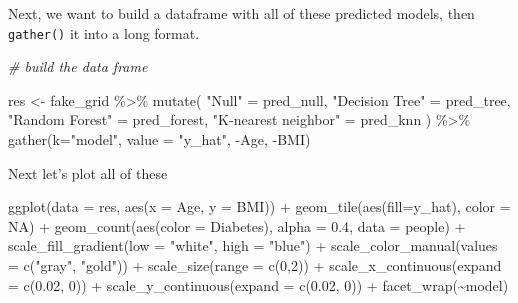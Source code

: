 \documentclass[
]{article}
\newenvironment{Shaded}{\begin{snugshade}}{\end{snugshade}}
\newcommand{\AttributeTok}[1]{\textcolor[rgb]{0.77,0.63,0.00}{#1}}
\newcommand{\CommentTok}[1]{\textcolor[rgb]{0.56,0.35,0.01}{\textit{#1}}}
\newcommand{\ConstantTok}[1]{\textcolor[rgb]{0.00,0.00,0.00}{#1}}
\newcommand{\DecValTok}[1]{\textcolor[rgb]{0.00,0.00,0.81}{#1}}
\newcommand{\FloatTok}[1]{\textcolor[rgb]{0.00,0.00,0.81}{#1}}
\newcommand{\FunctionTok}[1]{\textcolor[rgb]{0.00,0.00,0.00}{#1}}
\newcommand{\NormalTok}[1]{#1}
\newcommand{\OtherTok}[1]{\textcolor[rgb]{0.56,0.35,0.01}{#1}}
\newcommand{\SpecialCharTok}[1]{\textcolor[rgb]{0.00,0.00,0.00}{#1}}
\newcommand{\StringTok}[1]{\textcolor[rgb]{0.31,0.60,0.02}{#1}}
\begin{document}
Next, we want to build a dataframe with all of these predicted models,
then \texttt{gather()} it into a long format.

\begin{Shaded}
\begin{Highlighting}[]
\CommentTok{\# build the data frame}

\NormalTok{res }\OtherTok{\textless{}{-}}\NormalTok{ fake\_grid }\SpecialCharTok{\%\textgreater{}\%}
  \FunctionTok{mutate}\NormalTok{(}
    \StringTok{"Null"} \OtherTok{=}\NormalTok{ pred\_null, }\StringTok{"Decision Tree"} \OtherTok{=}\NormalTok{ pred\_tree,}
    \StringTok{"Random Forest"} \OtherTok{=}\NormalTok{ pred\_forest, }\StringTok{"K{-}nearest neighbor"} \OtherTok{=}\NormalTok{ pred\_knn}
\NormalTok{  ) }\SpecialCharTok{\%\textgreater{}\%}
  \FunctionTok{gather}\NormalTok{(}\AttributeTok{k=}\StringTok{"model"}\NormalTok{, }\AttributeTok{value =} \StringTok{"y\_hat"}\NormalTok{, }\SpecialCharTok{{-}}\NormalTok{Age, }\SpecialCharTok{{-}}\NormalTok{BMI)}
\end{Highlighting}
\end{Shaded}

Next let's plot all of these

\begin{Shaded}
\begin{Highlighting}[]
\FunctionTok{ggplot}\NormalTok{(}\AttributeTok{data =}\NormalTok{ res, }\FunctionTok{aes}\NormalTok{(}\AttributeTok{x =}\NormalTok{ Age, }\AttributeTok{y =}\NormalTok{ BMI)) }\SpecialCharTok{+}
  \FunctionTok{geom\_tile}\NormalTok{(}\FunctionTok{aes}\NormalTok{(}\AttributeTok{fill=}\NormalTok{y\_hat), }\AttributeTok{color =} \ConstantTok{NA}\NormalTok{) }\SpecialCharTok{+}
  \FunctionTok{geom\_count}\NormalTok{(}\FunctionTok{aes}\NormalTok{(}\AttributeTok{color =}\NormalTok{ Diabetes), }\AttributeTok{alpha =} \FloatTok{0.4}\NormalTok{, }\AttributeTok{data =}\NormalTok{ people) }\SpecialCharTok{+}
  \FunctionTok{scale\_fill\_gradient}\NormalTok{(}\AttributeTok{low =} \StringTok{"white"}\NormalTok{, }\AttributeTok{high =} \StringTok{"blue"}\NormalTok{) }\SpecialCharTok{+}
  \FunctionTok{scale\_color\_manual}\NormalTok{(}\AttributeTok{values =} \FunctionTok{c}\NormalTok{(}\StringTok{"gray"}\NormalTok{, }\StringTok{"gold"}\NormalTok{)) }\SpecialCharTok{+}
  \FunctionTok{scale\_size}\NormalTok{(}\AttributeTok{range =} \FunctionTok{c}\NormalTok{(}\DecValTok{0}\NormalTok{,}\DecValTok{2}\NormalTok{)) }\SpecialCharTok{+}
  \FunctionTok{scale\_x\_continuous}\NormalTok{(}\AttributeTok{expand =} \FunctionTok{c}\NormalTok{(}\FloatTok{0.02}\NormalTok{, }\DecValTok{0}\NormalTok{)) }\SpecialCharTok{+}
  \FunctionTok{scale\_y\_continuous}\NormalTok{(}\AttributeTok{expand =} \FunctionTok{c}\NormalTok{(}\FloatTok{0.02}\NormalTok{, }\DecValTok{0}\NormalTok{)) }\SpecialCharTok{+}
  \FunctionTok{facet\_wrap}\NormalTok{(}\SpecialCharTok{\textasciitilde{}}\NormalTok{model)}
\end{Highlighting}
\end{Shaded}
\end{document}
